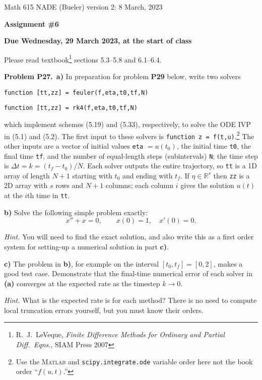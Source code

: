 \documentclass[12pt]{amsart}
\newcommand{\RR}{\mathbb{R}}
\newcommand{\Matlab}{\textsc{Matlab}\xspace}
\newcommand{\prob}[1]{\bigskip\noindent\textbf{#1}\quad }
\newcommand{\epart}[1]{\medskip\noindent\textbf{#1)}\quad }
\newcommand{\ppart}[1]{\,\textbf{#1)}\quad }
\begin{document}
\scriptsize \noindent Math 615 NADE (Bueler) \hfill version 2: 8 March, 2023
\normalsize

\medskip\bigskip

\Large\centerline{\textbf{Assignment \#6}}
\large
\bigskip

\centerline{\textbf{Due Wednesday, 29 March 2023, at the start of class}}
\bigskip
\normalsize

\thispagestyle{empty}

\bigskip
Please read textbook\footnote{R.~J.~LeVeque, \emph{Finite Difference Methods for Ordinary and Partial Diff.~Eqns.}, SIAM Press 2007} sections 5.3--5.8 and 6.1--6.4.


\medskip
\prob{Problem P27.}  \ppart{a}  In preparation for problem \textbf{P29} below, write two solvers

\centerline{\texttt{function [tt,zz] = feuler(f,eta,t0,tf,N)}}

\centerline{\texttt{function [tt,zz] = rk4(f,eta,t0,tf,N)}}

\noindent which implement schemes (5.19) and (5.33), respectively, to solve the ODE IVP in (5.1) and (5.2).  The first input to these solvers is \texttt{function z = f(t,u)}.\footnote{Use the \Matlab and \texttt{scipy.integrate.ode} variable order here not the book order ``$f(u,t)$.''}  The other inputs are a vector of initial values \texttt{eta} $= u(t_0)$, the initial time \texttt{t0}, the final time \texttt{tf}, and the number of equal-length steps (subintervals) \texttt{N}; the time step is $\Delta t = k = (t_f-t_0)/N$.  Each solver outputs the entire trajectory, so \texttt{tt} is a 1D array of length $N+1$ starting with $t_0$ and ending with $t_f$.  If $\eta\in\RR^s$ then \texttt{zz} is a 2D array with $s$ rows and $N+1$ columns; each column $i$ gives the solution $u(t)$ at the $i$th time in \texttt{tt}.

\epart{b}  Solve the following simple problem exactly:
    $$x'' + x = 0, \qquad x(0)=1, \quad x'(0)=0.$$

\medskip
\noindent \emph{Hint.}  You will need to find the exact solution, and also write this as a first order system for setting-up a numerical solution in part \textbf{c)}.

\epart{c} The problem in \textbf{b)}, for example on the interval $[t_0,t_f] = [0,2]$, makes a good test case.  Demonstrate that the final-time numerical error of each solver in \textbf{(a)} converges at the expected rate as the timestep $k\to 0$.

\medskip
\noindent \emph{Hint.} What is the expected rate is for each method?  There is no need to compute local truncation errors yourself, but you must know their orders.
\end{document}
